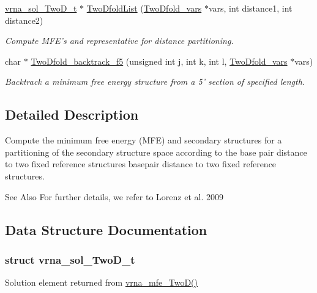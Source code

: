 \begin{DoxyCompactItemize}
\hyperlink{group__kl__neighborhood__mfe_structvrna__sol__TwoD__t}{vrna\-\_\-sol\-\_\-\-Two\-D\-\_\-t} $\ast$ \hyperlink{group__kl__neighborhood__mfe_ga7fc5e3e92fe97914ca4eccd33c01c2a7}{Two\-Dfold\-List} (\hyperlink{group__kl__neighborhood__mfe_structTwoDfold__vars}{Two\-Dfold\-\_\-vars} $\ast$vars, int distance1, int distance2)
\begin{DoxyCompactList}\small\item\em Compute M\-F\-E's and representative for distance partitioning. \end{DoxyCompactList}\item 
char $\ast$ \hyperlink{group__kl__neighborhood__mfe_gaf4dc05bf8fc1ea53acd7aeb798ba80c2}{Two\-Dfold\-\_\-backtrack\-\_\-f5} (unsigned int j, int k, int l, \hyperlink{group__kl__neighborhood__mfe_structTwoDfold__vars}{Two\-Dfold\-\_\-vars} $\ast$vars)
\begin{DoxyCompactList}\small\item\em Backtrack a minimum free energy structure from a 5' section of specified length. \end{DoxyCompactList}\end{DoxyCompactItemize}


\subsection{Detailed Description}
Compute the minimum free energy (M\-F\-E) and secondary structures for a partitioning of the secondary structure space according to the base pair distance to two fixed reference structures basepair distance to two fixed reference structures. \begin{DoxySeeAlso}{See Also}
For further details, we refer to Lorenz et al. 2009 \cite{lorenz:2009} 
\end{DoxySeeAlso}


\subsection{Data Structure Documentation}
\label{structvrna__sol__TwoD__t}
\hypertarget{group__kl__neighborhood__mfe_structvrna__sol__TwoD__t}{}
\subsubsection{struct vrna\-\_\-sol\-\_\-\-Two\-D\-\_\-t}
Solution element returned from \hyperlink{group__kl__neighborhood__mfe_ga243c288b463147352829df04de6a2f77}{vrna\-\_\-mfe\-\_\-\-Two\-D()} 

